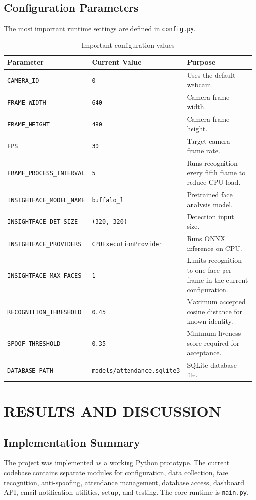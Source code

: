 \documentclass[12pt,a4paper]{report}
\newcommand{\JustifiedNormal}{\fontsize{12}{14}\selectfont\justifying\setlength{\parindent}{0pt}}
\begin{document}
\section{Configuration Parameters}
\JustifiedNormal
The most important runtime settings are defined in \texttt{config.py}.

\begin{longtable}{|p{}|p{}|p{}|}
\caption{Important configuration values}\\
\hline
\textbf{Parameter} & \textbf{Current Value} & \textbf{Purpose}\\
\hline
\texttt{CAMERA\_ID} & \texttt{0} & Uses the default webcam.\\
\hline
\texttt{FRAME\_WIDTH} & \texttt{640} & Camera frame width.\\
\hline
\texttt{FRAME\_HEIGHT} & \texttt{480} & Camera frame height.\\
\hline
\texttt{FPS} & \texttt{30} & Target camera frame rate.\\
\hline
\texttt{FRAME\_PROCESS\_INTERVAL} & \texttt{5} & Runs recognition every fifth frame to reduce CPU load.\\
\hline
\texttt{INSIGHTFACE\_MODEL\_NAME} & \texttt{buffalo\_l} & Pretrained face analysis model.\\
\hline
\texttt{INSIGHTFACE\_DET\_SIZE} & \texttt{(320, 320)} & Detection input size.\\
\hline
\texttt{INSIGHTFACE\_PROVIDERS} & \texttt{CPUExecutionProvider} & Runs ONNX inference on CPU.\\
\hline
\texttt{INSIGHTFACE\_MAX\_FACES} & \texttt{1} & Limits recognition to one face per frame in the current configuration.\\
\hline
\texttt{RECOGNITION\_THRESHOLD} & \texttt{0.45} & Maximum accepted cosine distance for known identity.\\
\hline
\texttt{SPOOF\_THRESHOLD} & \texttt{0.35} & Minimum liveness score required for acceptance.\\
\hline
\texttt{DATABASE\_PATH} & \texttt{models/attendance.sqlite3} & SQLite database file.\\
\hline
\end{longtable}

\chapter{RESULTS AND DISCUSSION}

\section{Implementation Summary}
\JustifiedNormal
The project was implemented as a working Python prototype. The current codebase contains separate modules for configuration, data collection, face recognition, anti-spoofing, attendance management, database access, dashboard API, email notification utilities, setup, and testing. The core runtime is \texttt{main.py}.
\end{document}
